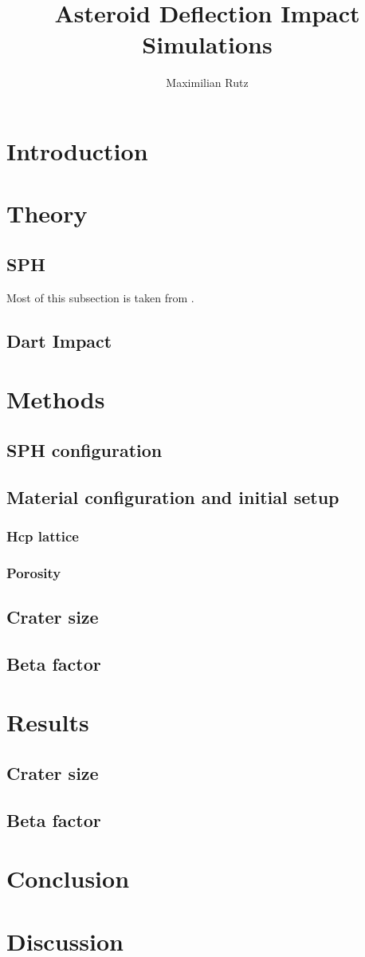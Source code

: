 \documentclass{article}
\title{Asteroid Deflection Impact Simulations}
\author{Maximilian Rutz}
\date{}
\begin{document}
	\maketitle
	\begin{abstract}
	 
	\end{abstract}
	
	\newpage
	\tableofcontents
	 
	\newpage
	\section{Introduction} 
	\section{Theory}
		\subsection{SPH}
			Most of this subsection is taken from \cite{Jutzi_p_alpha_1}.	
		\subsection{Dart Impact}
	\section{Methods}
		\subsection{SPH configuration}
		\subsection{Material configuration and initial setup}
			\subsubsection{Hcp lattice}
			\subsubsection{Porosity}			
		\subsection{Crater size}
		\subsection{Beta factor}

	\section{Results}
		\subsection{Crater size}
		\subsection{Beta factor}
	\section{Conclusion}
	\section{Discussion}
	
	\newpage 
	\printbibliography
 
\end{document}
